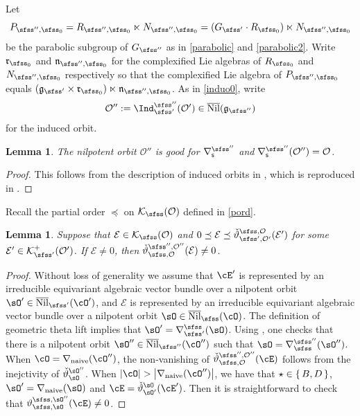 \documentclass[11pt,a4paper]{amsart}
\def\abs#1{\left|{#1}\right|}
\newcommand{\CE}{{\mathcal {E}}}
\newcommand{\CK}{{\mathcal {K}}}
\newcommand{\CO}{{\mathcal {O}}}
\newcommand{\g}{\mathfrak g}
\def\DD{\nabla}
\numberwithin{equation}{section}
\newtheorem{lem}[thm]{Lemma}
\theoremstyle{remark}
\def\Nil{\overline{\mathrm{Nil}}}
\def\DDn{\DD_{\mathrm{naive}}}
\begin{document}
Let
\[
  P_{\sfss'',\sfss_0}=R_{\sfss'',\sfss_0}\ltimes N_{\sfss'',\sfss_0}=(G_{\sfss'}\cdot R_{\sfss_0})\ltimes N_{\sfss'',\sfss_0}
\]
be the parabolic subgroup of $G_{\sfss''}$ as in \eqref{parabolic} and \eqref{parabolic2}. Write $\mathfrak r_{\sfss_0}$ and $\mathfrak n_{\sfss'',\sfss_0}$ for the complexified Lie algebras of $R_{\sfss_0}$ and $N_{\sfss'',\sfss_0}$ respectively so that  the complexified Lie algebra of $P_{\sfss'', \sfss_0}$ equals $(\g_{\sfss'}\times \mathfrak r_{\sfss_0})\ltimes \mathfrak n_{\sfss'',\sfss_0}$.
As in \eqref{induo0}, write 
\[
  \CO'':= \Ind_{\sfss'}^{\sfss''}  (\CO')\in \Nil(\g_{\sfss''}) 
\]
for the induced orbit. 


\begin{lem}
The nilpotent orbit $\CO''$ is good for  $\nabla_\mathsf s^{\sfss''}$ and $\nabla_\mathsf s^{\sfss''}(\CO'')=\CO$.
\end{lem}
\begin{proof}
This follows from the description of induced orbits in \cite[Section 7.3]{CM}, which is reproduced in 
. 
\end{proof}

Recall the partial order  $\preceq $ on $ \CK_\sfss(\CO)$ defined in  \eqref{pord}.

\begin{lem}\label{lem74}
Suppose that $\CE\in \CK_{\sfss}(\CO)$ and $0\preceq \CE\preceq \check \vartheta_{\sfss', \CO'}^{\sfss, \CO}(\CE')$ for some $\CE'\in \CK^+_{\sfss'}(\CO')$. If $\CE\neq 0$, then  $\check \vartheta_{\sfss, \CO}^{\sfss'', \CO''}(\CE)\neq 0$.
\end{lem}
\begin{proof}
  Without loss of generality we assume that $\cE'$ is represented by an irreducible equivariant algebraic vector bundle over a nilpotent orbit $\sO'\in \Nil_{\sfss'}(\cO')$, and $\CE$ is represented by an irreducible equivariant algebraic vector bundle over a nilpotent orbit $\sO\in \Nil_{\sfss}(\cO)$.
  The definition of geometric theta lift implies that $\sO'=\DDss(\sO)$. Using ,
  one checks that there is a nilpotent orbit $\sO''\in \Nil_{\sfss''}(\cO'')$ such that
  $\sO = \DD_{\sfss}^{\sfss''}(\sO'')$.
  When $\cO = \DDn(\cO'')$, the non-vanishing of $\check \vartheta_{\sfss, \CO}^{\sfss'', \CO''}(\cE)$
  follows from the inejctivity of $\dlift_{\sO}^{\sO''}$.
  When $\abs{\cO} > \abs{\DDn(\cO'')}$, we have that $\star \in \set{B,D}$, $\sO'=\DDn(\sO)$
  and  $\cE = \dlift_{\sO'}^{\sO}(\cE')$.
  Then it is straightforward to check that $\vartheta_{\sfss,\sO}^{\sfss,\sO''}(\cE) \neq 0$.
\end{proof}
\end{document}
